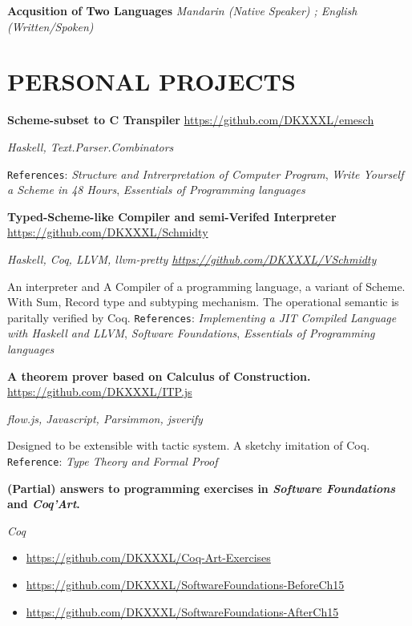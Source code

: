 \documentclass[fontsize=11pt]{article}
\newcommand{\NewPart}[1]{\section*{\uppercase{#1}}}
\newcommand{\SkillEntry}[2]{       %
    \noindent \textbf{#1} \hfill      %
        \noindent \textit{#2} \par        %
}
\newcommand{\EducationEntry}[4]{
    \noindent \textbf{#1} \hfill      %
    \colorbox{Black}{ 
      \parbox{11em}{
      \centering \color{White}#2}} \par  %
    \noindent \textit{#3} \par        %
    \noindent\hangindent=0em\hangafter=0 \small #4 %
    \normalsize \par}
\newcommand{\ProjectEntry}[4]{         %
    \noindent \textbf{#1}  \hfill {#2} \par
    \noindent \textit{#3} \par
    \noindent \small #4 %
    \normalsize \par}
\begin{document}
\SkillEntry{Acqusition of Two Languages}{
    Mandarin (Native Speaker) ; English (Written/Spoken)
}

\NewPart{Personal Projects}{}

\ProjectEntry{Scheme-subset to C Transpiler}{\url{https://github.com/DKXXXL/emesch}}
{Haskell, Text.Parser.Combinators}
{ \texttt{References}: \textit{Structure and Intrerpretation of Computer Program}, \textit{Write Yourself a Scheme in 48 Hours}, \textit{Essentials of Programming languages}}

\ProjectEntry{Typed-Scheme-like  Compiler and semi-Verifed Interpreter }{\url{https://github.com/DKXXXL/Schmidty}}
{Haskell, Coq, LLVM, llvm-pretty \hfill {\normalfont \url{https://github.com/DKXXXL/VSchmidty}}}
{An interpreter and A Compiler of a programming language, a variant of Scheme. With Sum, Record type and subtyping mechanism.  
The operational semantic is paritally verified by Coq. 
\texttt{References}: \textit{Implementing a JIT Compiled Language with Haskell and LLVM}, \textit{Software Foundations}, \textit{Essentials of Programming languages} }

\ProjectEntry{A theorem prover based on Calculus of Construction.}{\url{ https://github.com/DKXXXL/ITP.js}}
{flow.js, Javascript, Parsimmon, jsverify }
{Designed to be extensible with tactic system. 
A sketchy imitation of Coq. 
\texttt{Reference}: \textit{Type Theory and Formal Proof}
}


\ProjectEntry{(Partial) answers to programming exercises in \textit{Software Foundations} and \textit{Coq’Art}.}{}{Coq}{
\begin{itemize}
    \item \url{https://github.com/DKXXXL/Coq-Art-Exercises}
    \item \url{https://github.com/DKXXXL/SoftwareFoundations-BeforeCh15}
    \item \url{https://github.com/DKXXXL/SoftwareFoundations-AfterCh15} 
\end{itemize}
}

\ 
\end{document}
